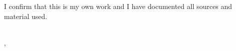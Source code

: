 \thispagestyle{empty}
\vspace*{0.6\textheight}
\noindent
I confirm that this \getDoctype{} is my own work and I have documented all sources and material used.

\vspace{15mm}
\noindent
\getAuthor{}
\\
\getSubmissionLocation{}, \getSubmissionDate{} 
\cleardoublepage{}
